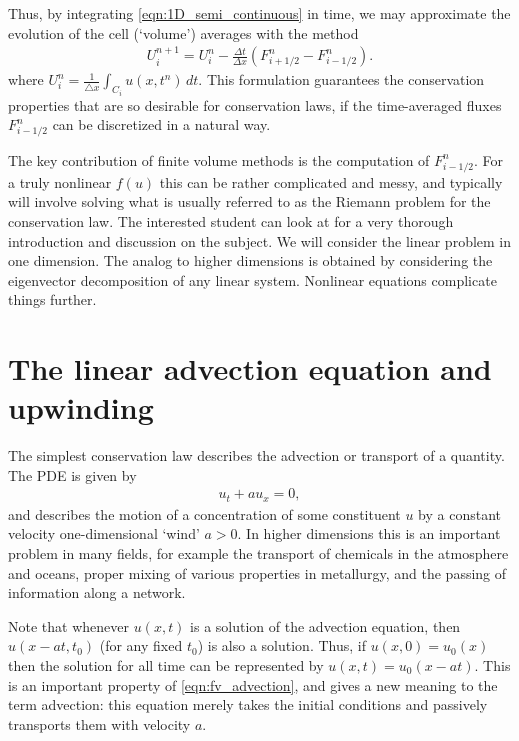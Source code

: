 Thus, by integrating \eqref{eqn:1D_semi_continuous} in time, we may approximate the evolution of the cell (`volume') averages with the method
\begin{align}
\label{eqn:flux_form}
U_i^{n+1} = U_i^n - \frac{\Delta t}{\Delta x} \left(F^n_{i+1/2}-F^n_{i-1/2}\right).
\end{align}
where $U_i^n = \frac{1}{\triangle x} \int_{C_i} u(x,t^n) \, dt$.
This formulation guarantees the conservation properties that are so desirable for conservation laws, if the time-averaged fluxes $F_{i-1/2}^n$ can be discretized in a natural way.

The key contribution of finite volume methods is the computation of $F_{i-1/2}^n$.
For a truly nonlinear $f(u)$ this can be rather complicated and messy, and typically will involve solving what is usually referred to as the Riemann problem for the conservation law.
The interested student can look at \cite{Le2002} for a very thorough introduction and discussion on the subject.
We will consider the linear problem in one dimension.
The analog to higher dimensions is obtained by considering the eigenvector decomposition of any linear system.
Nonlinear equations complicate things further.

\section*{The linear advection equation and upwinding}
The simplest conservation law describes the advection or transport of a quantity.
The PDE is given by
\begin{align}
u_t + au_x = 0, \label{eqn:fv_advection}
\end{align}
and describes the motion of a concentration of some constituent $u$ by a constant velocity one-dimensional `wind' $a>0$.
In higher dimensions this is an important problem in many fields, for example the transport of chemicals in the atmosphere and oceans, proper mixing of various properties in metallurgy, and the passing of information along a network.

Note that whenever $u(x,t)$ is a solution of the advection equation, then $u(x-at,t_0)$ (for any fixed $t_0$) is also a solution.
Thus, if $u(x,0) = u_0(x)$ then the solution for all time can be represented by $u(x,t) = u_0(x-at)$.
This is an important property of \eqref{eqn:fv_advection}, and gives a new meaning to the term advection: this equation merely takes the initial conditions and passively transports them with velocity $a$.

